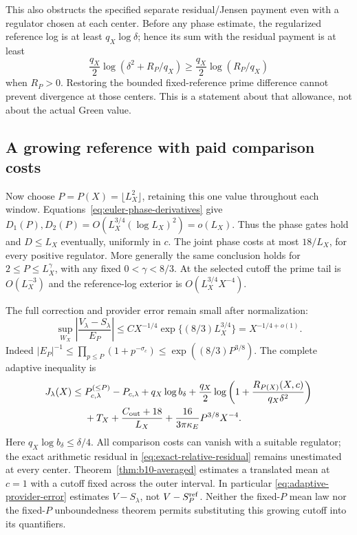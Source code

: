 This also obstructs the specified separate residual/Jensen payment
even with a regulator chosen at each center. Before any phase estimate,
the regularized reference log is at least \(q_X\log\delta\); hence
its sum with the residual payment is at least
\[
 \frac{q_X}{2}\log(\delta^2+R_P/q_X)
      \ge\frac{q_X}{2}\log(R_P/q_X)
\]
when \(R_P>0\). Restoring the bounded fixed-reference prime
difference cannot prevent divergence at those centers. This is a
statement about that allowance, not about the actual Green value.

\subsection{A growing reference with paid comparison costs}
Now choose \(P=P(X)=\lfloor L_X^2\rfloor\), retaining this one
value throughout each window. Equations~\eqref{eq:euler-phase-derivatives}
give \(D_1(P),D_2(P)=O(L_X^{3/4}(\log L_X)^2)=o(L_X)\).
Thus the phase gates hold and \(D\le L_X\) eventually, uniformly
in \(c\). The joint phase costs at most \(18/L_X\), for every
positive regulator. More generally the same conclusion holds for
\(2\le P\le L_X^\gamma\), with any fixed \(0<\gamma<8/3\).
At the selected cutoff the prime tail is \(O(L_X^{-3})\) and the
reference-log exterior is \(O(L_X^{3/4}X^{-4})\).

The full correction and provider error remain small after normalization:
\begin{equation}\label{eq:adaptive-provider-error}
 \sup_{W_X}\left|\frac{V_\lambda-S_\lambda}{E_P}\right|
 \le CX^{-1/4}\exp\{(8/3)L_X^{3/4}\}=X^{-1/4+o(1)}.
\end{equation}
Indeed \(|E_P|^{-1}\le\prod_{p\le P}(1+p^{-\sigma_c})
\le\exp((8/3)P^{3/8})\). The complete adaptive inequality is
\begin{align}\label{eq:adaptive-allowance}
 J_\lambda(X)\le{}&P_{c,\lambda}^{(\le P)}-P_{c,\lambda}
 +q_X\log b_\delta
 +\frac{q_X}{2}\log\left(1+\frac{R_{P(X)}(X,c)}{q_X\delta^2}\right)
 \nonumber\\
 &+T_X+\frac{C_{\rm out}+18}{L_X}
       +\frac{16}{3\pi\kappa_E}P^{3/8}X^{-4}.
\end{align}
Here \(q_X\log b_\delta\le\delta/4\). All comparison costs can
vanish with a suitable regulator; the exact arithmetic residual in
\eqref{eq:exact-relative-residual} remains unestimated at every center.
Theorem~\ref{thm:b10-averaged} estimates a translated mean at \(c=1\)
with a cutoff fixed across the outer interval. In particular
\eqref{eq:adaptive-provider-error} estimates \(V-S_\lambda\),
not \(V-S_P^{\rm ref}\). Neither the fixed-\(P\) mean law nor
the fixed-\(P\) unboundedness theorem permits substituting this
growing cutoff into its quantifiers.

